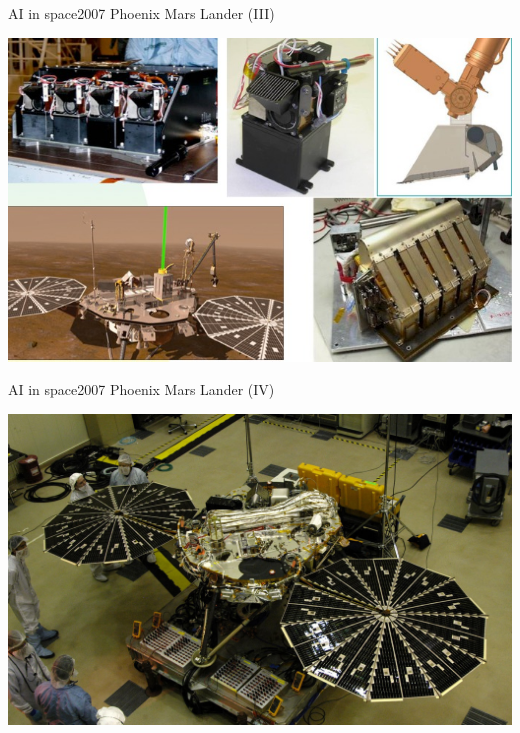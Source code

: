 \documentclass[10pt,compress]{beamer} %
\begin{document}
{	\begin{frame}{AI in space}{2007 Phoenix Mars Lander (III)}
		\vspace{-0.5cm}
		\begin{center}
			\includegraphics[width=0.8\linewidth]{figs/instrumentsPhoenix.jpg}
		\end{center}
	\end{frame}

	\begin{frame}{AI in space}{2007 Phoenix Mars Lander (IV)}
		\vspace{-0.5cm}
		\begin{center}
			\includegraphics[width=0.8\linewidth]{figs/testing.jpg}
		\end{center}
	\end{frame}

}
\end{document}
